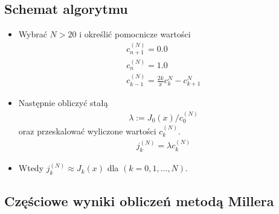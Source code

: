 \documentclass{article}
\begin{document}
\subsection{Schemat algorytmu}
\begin{itemize}
\item Wybrać $N > 20$ i określić pomocnicze wartości
\begin{align*}
c_{n + 1}^{(N)} = 0.0 \\
c_{n}^{(N)} = 1.0\\
c_{k - 1}^{(N)} = \frac{2k}{x} c_{k}^{{N}} - c_{k + 1}^{{N}}  \tag*{(k = N, N - 1,.., 1).}
\end{align*}
\item Następnie obliczyć stałą
\begin{align*}
\lambda := J_0(x) / c_{0}^{(N)}
\end{align*}
oraz przeskalować wyliczone wartości $c_{k}^{(N)}$.
\begin{align*}
j_{k}^{(N)} = \lambda c_{k}^{(N)}
\end{align*}
\item Wtedy $j_{k}^{(N)} \approx J_k(x)$ dla $(k = 0, 1, ..., N)$.
\end{itemize}

\subsection{Częściowe wyniki obliczeń metodą Millera}
\end{document}
